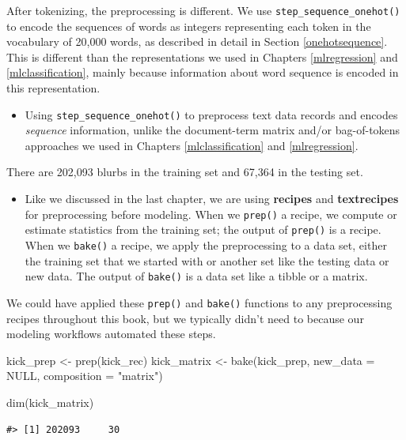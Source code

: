 \documentclass[
]{krantz}
\makeatletter
\newenvironment{Shaded}{\begin{snugshade}}{\end{snugshade}}
\newcommand{\AttributeTok}[1]{\textcolor[rgb]{0.77,0.63,0.00}{#1}}
\newcommand{\ConstantTok}[1]{\textcolor[rgb]{0.00,0.00,0.00}{#1}}
\newcommand{\FunctionTok}[1]{\textcolor[rgb]{0.00,0.00,0.00}{#1}}
\newcommand{\NormalTok}[1]{#1}
\newcommand{\OtherTok}[1]{\textcolor[rgb]{0.56,0.35,0.01}{#1}}
\newcommand{\StringTok}[1]{\textcolor[rgb]{0.31,0.60,0.02}{#1}}
\newenvironment{kframe}{%
\medskip{}
\setlength{\fboxsep}{.8em}
 \def\at@end@of@kframe{}%
 \ifinner\ifhmode%
  \def\at@end@of@kframe{\end{minipage}}%
  \begin{minipage}{\columnwidth}%
 \fi\fi%
 \def\FrameCommand##1{\hskip\@totalleftmargin \hskip-\fboxsep
 \colorbox{shadecolor}{##1}\hskip-\fboxsep
     \hskip-\linewidth \hskip-\@totalleftmargin \hskip\columnwidth}%
 \MakeFramed {\advance\hsize-\width
   \@totalleftmargin\z@ \linewidth\hsize
   \@setminipage}}%
 {\par\unskip\endMakeFramed%
 \at@end@of@kframe}
\renewenvironment{Shaded}{\begin{kframe}}{\end{kframe}}
\newenvironment{rmdblock}[1]
  {\begin{shaded*}
  \begin{itemize}[left = -1cm, labelsep = 1cm]
  \renewcommand{\labelitemi}{
    \raisebox{-.7\height}[0pt][0pt]{
      {\setkeys{Gin}{width=3em,keepaspectratio}\texttt{[image: images/\#1]}}
    }
  }
 
  \item
  }
  {
  \end{itemize}
  \end{shaded*}
  }
\newenvironment{rmdnote}
  {\begin{rmdblock}{note}}
  {\end{rmdblock}}
\newenvironment{rmdpackage}
  {\begin{rmdblock}{package}}
  {\end{rmdblock}}
\makeatother
\begin{document}
After tokenizing, the preprocessing is different. We use \texttt{step\_sequence\_onehot()} to encode the sequences of words as integers representing each token in the vocabulary of 20,000 words, as described in detail in Section \ref{onehotsequence}. This is different than the representations we used in Chapters \ref{mlregression} and \ref{mlclassification}, mainly because information about word sequence is encoded in this representation.

\begin{rmdnote}
Using \texttt{step\_sequence\_onehot()} to preprocess text data records and encodes \emph{sequence} information, unlike the document-term matrix and/or bag-of-tokens approaches we used in Chapters \ref{mlclassification} and \ref{mlregression}.
\end{rmdnote}

There are 202,093 blurbs in the training set and 67,364 in the testing set.

\begin{rmdpackage}
Like we discussed in the last chapter, we are using \textbf{recipes} and
\textbf{textrecipes} for preprocessing before modeling. When we
\texttt{prep()} a recipe, we compute or estimate statistics from the
training set; the output of \texttt{prep()} is a recipe. When we
\texttt{bake()} a recipe, we apply the preprocessing to a data set,
either the training set that we started with or another set like the
testing data or new data. The output of \texttt{bake()} is a data set
like a tibble or a matrix.
\end{rmdpackage}

We could have applied these \texttt{prep()} and \texttt{bake()} functions to any preprocessing recipes throughout this book, but we typically didn't need to because our modeling workflows automated these steps.

\begin{Shaded}
\begin{Highlighting}[]
\NormalTok{kick\_prep }\OtherTok{\textless{}{-}} \FunctionTok{prep}\NormalTok{(kick\_rec)}
\NormalTok{kick\_matrix }\OtherTok{\textless{}{-}} \FunctionTok{bake}\NormalTok{(kick\_prep, }\AttributeTok{new\_data =} \ConstantTok{NULL}\NormalTok{, }\AttributeTok{composition =} \StringTok{"matrix"}\NormalTok{)}

\FunctionTok{dim}\NormalTok{(kick\_matrix)}
\end{Highlighting}
\end{Shaded}

\begin{verbatim}
#> [1] 202093     30
\end{verbatim}
\end{document}
